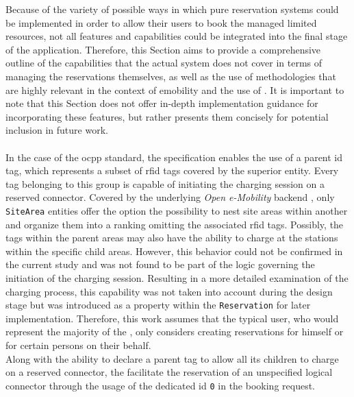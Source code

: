 Because of the variety of possible ways in which pure reservation systems could be implemented in order to allow their users to book the managed limited resources, not all features and capabilities could be integrated into the final stage of the application.
Therefore, this Section aims to provide a comprehensive outline of the capabilities that the actual system does not cover in terms of managing the reservations themselves, as well as the use of methodologies that are highly relevant in the context of \acrshort{emobility} and the use of .
It is important to note that this Section does not offer in-depth implementation guidance for incorporating these features, but rather presents them concisely for potential inclusion in future work. \\ \\
\noindent In the case of the \acrshort{ocpp} standard, the specification enables the use of a parent \acrshort{id} tag, which represents a subset of \acrshort{rfid} tags covered by the superior entity. Every tag belonging to this group is capable of initiating the charging session on a reserved connector.
Covered by the underlying \textit{Open e-Mobility} backend \cite{noauthor_github_nodate-2}, only \texttt{SiteArea} entities offer the option the possibility to nest site areas within another and organize them into a ranking omitting the associated \acrshort{rfid} tags.
Possibly, the tags within the parent areas may also have the ability to charge at the stations within the specific child areas. However, this behavior could not be confirmed in the current study and was not found to be part of the logic governing the initiation of the charging session.
Resulting in a more detailed examination of the charging process, this capability was not taken into account during the design stage but was introduced as a property within the \texttt{Reservation} for later implementation.
Therefore, this work assumes that the typical user, who would represent the majority of the , only considers creating reservations for himself or for certain persons on their behalf. \\ 
Along with the ability to declare a parent tag to allow all its children to charge on a reserved connector, the  facilitate the reservation of an unspecified logical connector through the usage of the dedicated \acrshort{id} \texttt{0} in the booking request.
